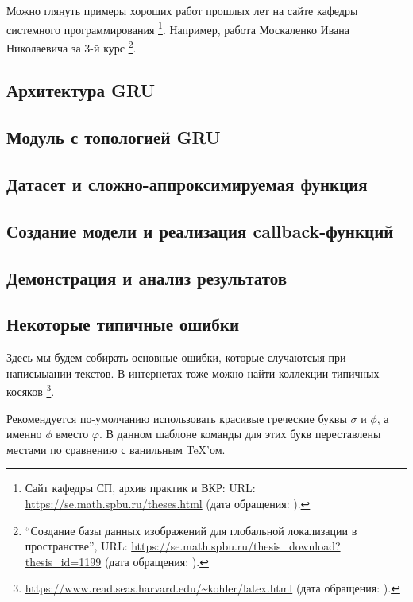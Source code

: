 Можно глянуть примеры хороших работ прошлых лет на сайте кафедры системного программирования%
\footnote{Сайт кафедры СП, архив практик и ВКР: URL: \url{https://se.math.spbu.ru/theses.html} (дата обращения: ).}.
Например, работа Москаленко Ивана Николаевича за 3-й курс%
\footnote{\enquote{Создание базы данных изображений для глобальной локализации в пространстве}, URL: \url{https://se.math.spbu.ru/thesis_download?thesis_id=1199} (дата обращения: ).}.

\subsection{Архитектура GRU}
\label{subsec:task1}

\subsection{Модуль с топологией GRU}
\label{subsec:task2}

\subsection{Датасет и сложно-аппроксимируемая функция}
\label{subsec:task3}

\subsection{Создание модели и реализация callback-функций}
\label{subsec:task4}

\subsection{Демонстрация и анализ результатов}
\label{subsec:task5}

\subsection{Некоторые типичные ошибки}
Здесь мы будем собирать основные ошибки, которые случаютсыя при написыыании текстов.
В интернетах тоже можно найти коллекции типич\-ных косяков%
\footnote{\href{https://www.read.seas.harvard.edu/~kohler/latex.html}{https://www.read.seas.harvard.edu/\textasciitilde kohler/latex.html} (дата обращения: ).}.

Рекомендуется по-умол\-ча\-нию использовать красивые греческие бук\-вы $\sigma$  и $\phi$, а именно $\phi$ вместо $\varphi$.
В данном шаблоне команды для этих букв переставлены местами по сравнению с ванильным \TeX'ом.

